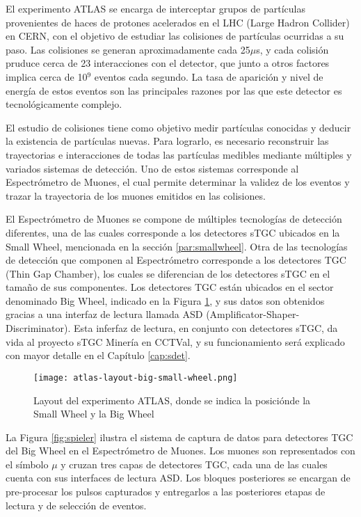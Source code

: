 	El experimento ATLAS se encarga de interceptar grupos de partículas provenientes de haces de protones acelerados en el LHC (Large Hadron Collider) en CERN, con el objetivo de estudiar las colisiones de partículas ocurridas a su paso. Las colisiones se generan aproximadamente cada 25$\mu$s\cite{Whiteson2016TheSystem}, y cada colisión pruduce cerca de 23 interacciones con el detector, que junto a otros factores implica cerca de 10$^9$ eventos cada segundo. La tasa de aparición y nivel de energía de estos eventos son las principales razones por las que este detector es tecnológicamente complejo.
	
	El estudio de colisiones tiene como objetivo medir partículas conocidas y deducir la existencia de partículas nuevas. Para lograrlo, es necesario reconstruir las trayectorias e interacciones de todas las partículas medibles mediante múltiples y variados sistemas de detección. Uno de estos sistemas corresponde al Espectrómetro de Muones\cite{Pontecorvo2004TheSpectrometer}, el cual permite determinar la validez de los eventos y trazar la trayectoria de los muones emitidos en las colisiones. 
	
	El Espectrómetro de Muones se compone de múltiples tecnologías de detección diferentes, una de las cuales corresponde a los detectores sTGC ubicados en la Small Wheel, mencionada en la sección \ref{par:smallwheel}. Otra de las tecnologías de detección que componen al Espectrómetro corresponde a los detectores TGC (Thin Gap Chamber), los cuales se diferencian de los detectores sTGC en el tamaño de sus componentes. Los detectores TGC están ubicados en el sector denominado Big Wheel, indicado en la Figura \ref{fig:both-wheels}, y sus datos son obtenidos gracias a una interfaz de lectura llamada ASD (Amplificator-Shaper-Discriminator). Esta inferfaz de lectura, en conjunto con detectores sTGC, da vida al proyecto sTGC Minería en CCTVal, y su funcionamiento será explicado con mayor detalle en el Capítulo \ref{cap:sdet}.
	
	\begin{figure}[h]
		\centering
		\texttt{[image: atlas-layout-big-small-wheel.png]} 
		\caption{Layout del experimento ATLAS, donde se indica la posiciónde la Small Wheel y la Big Wheel\cite{Formenti2018CERNReport}}
		\label{fig:both-wheels}
	\end{figure}
	
	La Figura \ref{fig:spieler} ilustra el sistema de captura de datos para detectores TGC del Big Wheel en el Espectrómetro de Muones. Los muones son representados con el símbolo $\mu$ y cruzan tres capas de detectores TGC, cada una de las cuales cuenta con sus interfaces de lectura ASD. Los bloques posteriores se encargan de pre-procesar los pulsos capturados y entregarlos a las posteriores etapas de lectura y de selección de eventos.
	
